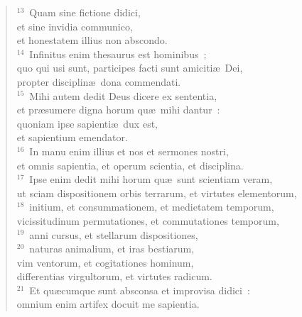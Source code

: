 \begin{flushleft}
\begin{verse}
${}^{13}$~Quam sine fictione didici,\\ et sine invidia communico,\\ et honestatem illius non abscondo.\\
${}^{14}$~Infinitus enim thesaurus est hominibus~;\\ quo qui usi sunt, participes facti sunt amiciti\ae\ Dei,\\ propter disciplin\ae\ dona commendati.\\
${}^{15}$~Mihi autem dedit Deus dicere ex sententia,\\ et pr\ae sumere digna horum qu\ae\ mihi dantur~:\\ quoniam ipse sapienti\ae\ dux est,\\ et sapientium emendator.\\
${}^{16}$~In manu enim illius et nos et sermones nostri,\\ et omnis sapientia, et operum scientia, et disciplina.\\
${}^{17}$~Ipse enim dedit mihi horum qu\ae\ sunt scientiam veram,\\ ut sciam dispositionem orbis terrarum, et virtutes elementorum,\\
${}^{18}$~initium, et consummationem, et medietatem temporum,\\ vicissitudinum permutationes, et commutationes temporum,\\
${}^{19}$~anni cursus, et stellarum dispositiones,\\
${}^{20}$~naturas animalium, et iras bestiarum,\\ vim ventorum, et cogitationes hominum,\\ differentias virgultorum, et virtutes radicum.\\
${}^{21}$~Et qu\ae cumque sunt absconsa et improvisa didici~:\\ omnium enim artifex docuit me sapientia.\end{verse}\end{flushleft}


